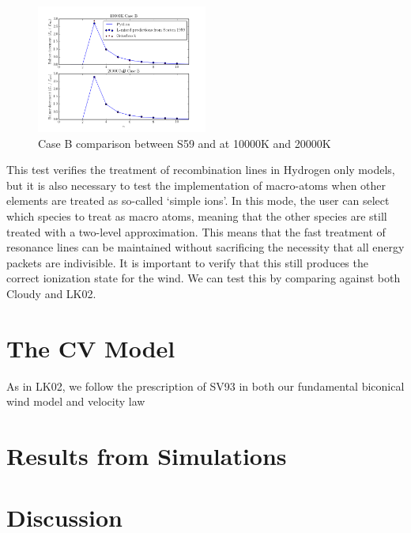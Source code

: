 \documentclass[usenatbib, a4paper]{mn2e}
\begin{document}
\begin{figure}
\includegraphics[width=0.5\textwidth]{figures/caseB.png}
\caption{Case B comparison between S59 and \py at 10000K and 20000K}
\end{figure}

This test verifies the treatment of recombination lines in Hydrogen only models, but it is also necessary to test the implementation
of macro-atoms when other elements are treated as so-called `simple ions'. In this mode, the user can select which species to treat as
macro atoms, meaning that the other species are still treated with a two-level approximation. This means that the fast treatment of
resonance lines can be maintained without sacrificing the necessity that all energy packets are indivisible. It is important to verify that 
this still produces the correct ionization state for the wind. We can test this by comparing against both {\textsc Cloudy} and LK02.



%
%

\section{The CV Model}
As in LK02, we follow the prescription of SV93 in both our fundamental biconical wind model and velocity law


%
%

\section{Results from Simulations}


%
%


\section{Discussion}
\end{document}
